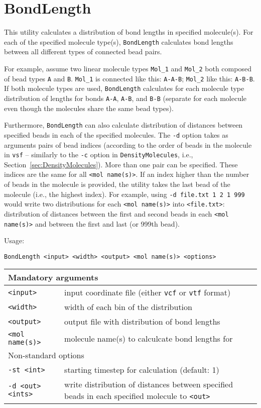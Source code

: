 \section{BondLength} \label{sec:BondLength}

This utility calculates a distribution of bond lengths in specified
molecule(s). For each of the specified molecule type(s),
\texttt{BondLength} calculates bond lengths between all different types of
connected bead pairs.

For example, assume two linear molecule types \texttt{Mol\_1} and
\texttt{Mol\_2} both composed of bead types \texttt{A} and \texttt{B}.
\texttt{Mol\_1} is connected like this: \texttt{A-A-B}; \texttt{Mol\_2}
like this: \texttt{A-B-B}. If both molecule types are used,
\texttt{BondLength} calculates for each molecule type distribution of
lengths for bonds \texttt{A-A}, \texttt{A-B}, and \texttt{B-B} (separate
for each molecule even though the molecules share the same bead types).

Furthermore, \texttt{BondLength} can also calculate distribution of
distances between specified beads in each of the specified molecules. The
\texttt{-d} option takes as arguments pairs of bead indices (according to
the order of beads in the molecule in \texttt{vsf} -- similarly to the
\texttt{-c} option in \texttt{DensityMolecules}, i.e.,
Section~\ref{sec:DensityMolecules}). More than one pair can be specified.
These indices are the same for all \texttt{<mol name(s)>}. If an index
higher than the number of beads in the molecule is provided, the utility
takes the last bead of the molecule (i.e., the highest index). For example,
using \texttt{-d file.txt 1 2 1 999} would write two distributions for each
\texttt{<mol name(s)>} into \texttt{<file.txt>}: distribution of distances
between the first and second beads in each \texttt{<mol name(s)>} and
between the first and last (or 999th bead).

Usage:

\vspace{1em}
\noindent
\texttt{BondLength <input> <width> <output> <mol name(s)> <options>}

\noindent
\begin{longtable}{p{}p{}}
  \toprule
  \multicolumn{2}{l}{Mandatory arguments} \\
  \midrule
  \texttt{<input>} & input coordinate file (either \texttt{vcf} or
    \texttt{vtf} format) \\
  \texttt{<width>} & width of each bin of the distribution \\
  \texttt{<output>} & output file with distribution of bond lengths \\
  \texttt{<mol name(s)>} & molecule name(s) to calculcate bond lengths for \\
  \toprule
  \multicolumn{2}{l}{Non-standard options} \\
  \midrule
  \texttt{-st <int>} & starting timestep for calculation (default: 1) \\
  \texttt{-d <out> <ints>} & write distribution of distances
    between specified beads in each specified molecule to \texttt{<out>}\\
  \bottomrule
\end{longtable}

